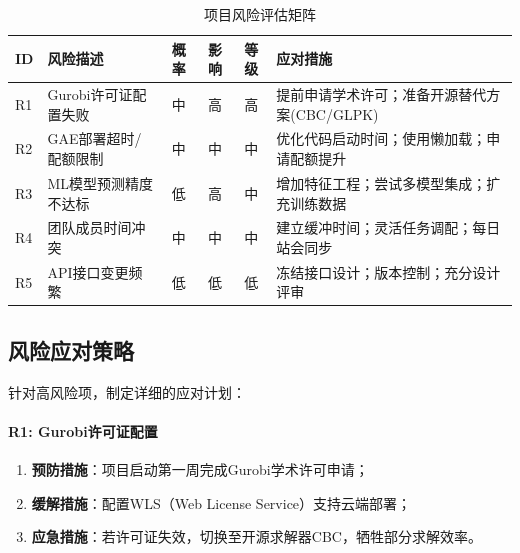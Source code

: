 \begin{table}[htbp]
    \centering
    \caption{项目风险评估矩阵}
    \label{tab:risks}
    \begin{tabular}{p{0.8cm}p{3.5cm}cccp{4cm}}
        \toprule
        \textbf{ID} & \textbf{风险描述} & \textbf{概率} & \textbf{影响} & \textbf{等级}            & \textbf{应对措施} \\
        \midrule
        R1          & Gurobi许可证配置失败 & 中           & 高           & \cellcolor{orange!30}高 &
        提前申请学术许可；准备开源替代方案(CBC/GLPK)                                                                      \\
        R2          & GAE部署超时/配额限制  & 中           & 中           & \cellcolor{yellow!30}中 &
        优化代码启动时间；使用懒加载；申请配额提升                                                                            \\
        R3          & ML模型预测精度不达标   & 低           & 高           & \cellcolor{yellow!30}中 &
        增加特征工程；尝试多模型集成；扩充训练数据                                                                            \\
        R4          & 团队成员时间冲突      & 中           & 中           & \cellcolor{yellow!30}中 &
        建立缓冲时间；灵活任务调配；每日站会同步                                                                             \\
        R5          & API接口变更频繁     & 低           & 低           & \cellcolor{green!30}低  &
        冻结接口设计；版本控制；充分设计评审                                                                               \\
        \bottomrule
    \end{tabular}
\end{table}

\subsection{风险应对策略}

针对高风险项，制定详细的应对计划：

\paragraph{R1: Gurobi许可证配置}
\begin{enumerate}
    \item \textbf{预防措施}：项目启动第一周完成Gurobi学术许可申请；
    \item \textbf{缓解措施}：配置WLS（Web License Service）支持云端部署；
    \item \textbf{应急措施}：若许可证失效，切换至开源求解器CBC，牺牲部分求解效率。
\end{enumerate}

